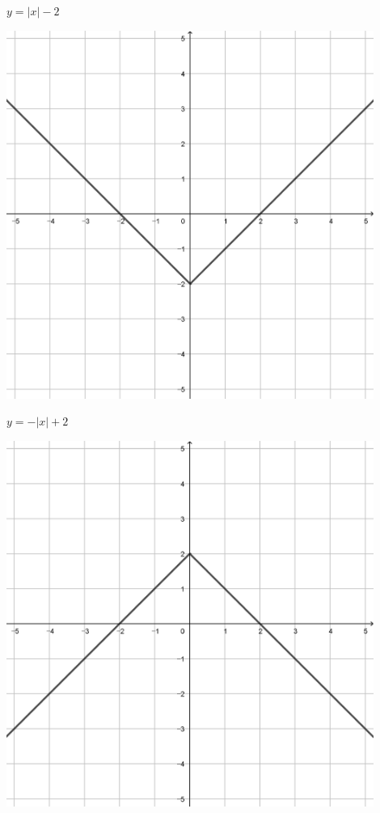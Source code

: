 \documentclass[a4paper]{oblivoir}
\begin{document}
\begin{minipage}{0.45\textwidth}\centering
\(y=|x|-2\)
\par\bigskip\includegraphics[width=0.9\textwidth]{img/3_piecewise_15}
\end{minipage}
\begin{minipage}{0.45\textwidth}\centering
\(y=-|x|+2\)
\par\bigskip\includegraphics[width=0.9\textwidth]{img/3_piecewise_16}
\end{minipage}\bigskip\bigskip\par
\end{document}
